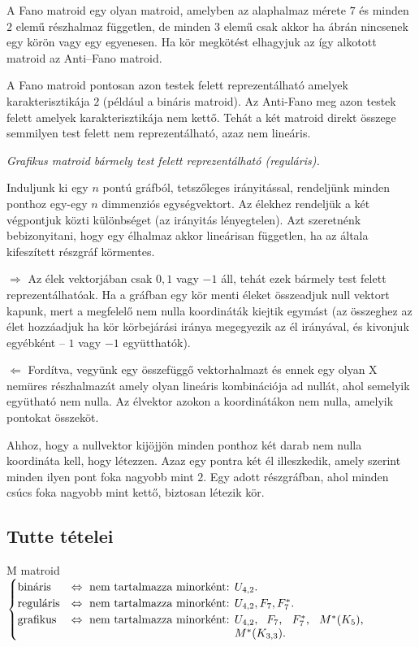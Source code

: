 A Fano matroid egy olyan matroid, amelyben az alaphalmaz mérete $7$ és minden
$2$ elemű részhalmaz független, de minden $3$ elemű csak akkor ha
 ábrán nincsenek egy körön vagy egy egyenesen. Ha kör megkötést
elhagyjuk az így alkotott matroid az Anti--Fano matroid.

A Fano matroid pontosan azon testek felett reprezentálható amelyek
karakterisztikája $2$ (például a bináris matroid). Az Anti-Fano meg azon testek
felett amelyek karakterisztikája nem kettő. Tehát a két matroid direkt összege
semmilyen test felett nem reprezentálható, azaz nem lineáris.

\vspace{0.4cm}
\emph{Grafikus matroid bármely test felett reprezentálható (reguláris).}
\vspace{0.4cm}

Induljunk ki egy $n$ pontú gráfból, tetszőleges irányitással, rendeljünk minden
ponthoz egy-egy $n$ dimmenziós egységvektort. Az élekhez rendeljük a két
végpontjuk közti különbséget (az irányitás lényegtelen). Azt szeretnénk
bebizonyitani, hogy egy élhalmaz akkor lineárisan független, ha az általa
kifeszített részgráf körmentes.

$\Rightarrow$  Az élek vektorjában csak $0,1$ vagy $-1$ áll, tehát ezek bármely
test felett reprezentálhatóak. Ha a gráfban egy kör menti éleket összeadjuk null vektort
kapunk, mert a megfelelő nem nulla koordináták kiejtik egymást (az összeghez az
élet hozzáadjuk ha kör körbejárási iránya megegyezik az él irányával, és
kivonjuk egyébként -- $1$ vagy $-1$ együtthatók).

$\Leftarrow$ Fordítva, vegyünk egy összefüggő vektorhalmazt és ennek egy olyan X
nemüres részhalmazát amely olyan lineáris kombinációja ad nullát, ahol semelyik
együtható nem nulla. Az élvektor azokon a koordinátákon nem nulla, amelyik
pontokat összeköt.

Ahhoz, hogy a nullvektor kijöjjön minden ponthoz két darab nem nulla koordináta
kell, hogy létezzen. Azaz egy pontra két él illeszkedik, amely szerint minden
ilyen pont foka nagyobb mint $2$.  Egy adott részgráfban, ahol minden csúcs foka
nagyobb mint kettő, biztosan létezik kör.

\subsection{Tutte tételei}

M matroid $\begin{cases}
\mbox{bináris} &\Leftrightarrow \mbox{ nem tartalmazza minorként: } U_{4,2}. \\
\mbox{reguláris} &\Leftrightarrow \mbox{ nem tartalmazza minorként: } U_{4,2}, F_7, F_7^*. \\
\mbox{grafikus} &\Leftrightarrow \mbox{ nem tartalmazza minorként: } \parbox[t]{4cm}{
$U_{4,2},$ $F_7$, $F_7^*$, $M^*(K_5)$, $M^*(K_{3,3})$.} \\
\end{cases}$

